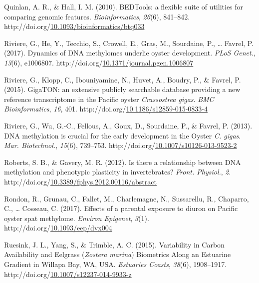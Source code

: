 \documentclass [11pt, proquest] {uwthesis}[2015/03/03]
\newlength{\cslhangindent}
\newenvironment{CSLReferences}%
{\setlength{\parindent}{0pt}%
\everypar{\setlength{\hangindent}{\cslhangindent}}\ignorespaces}%
{\par}
\begin{document}
\begin{CSLReferences}{1}{0}
\leavevmode\hypertarget{ref-Quinlan2010}{}%
Quinlan, A. R., \& Hall, I. M. (2010). {BEDTools: a flexible suite of utilities for comparing genomic features}. \emph{Bioinformatics}, \emph{26}(6), 841--842. http://doi.org/\href{https://doi.org/10.1093/bioinformatics/btq033}{10.1093/bioinformatics/btq033}

\leavevmode\hypertarget{ref-Riviere2017}{}%
Riviere, G., He, Y., Tecchio, S., Crowell, E., Gras, M., Sourdaine, P., \ldots{} Favrel, P. (2017). {Dynamics of DNA methylomes underlie oyster development}. \emph{PLoS Genet.}, \emph{13}(6), e1006807. http://doi.org/\href{https://doi.org/10.1371/journal.pgen.1006807}{10.1371/journal.pgen.1006807}

\leavevmode\hypertarget{ref-Riviere2015}{}%
Riviere, G., Klopp, C., Ibouniyamine, N., Huvet, A., Boudry, P., \& Favrel, P. (2015). {GigaTON: an extensive publicly searchable database providing a new reference transcriptome in the Pacific oyster \emph{Crassostrea gigas}}. \emph{BMC Bioinformatics}, \emph{16}, 401. http://doi.org/\href{https://doi.org/10.1186/s12859-015-0833-4}{10.1186/s12859-015-0833-4}

\leavevmode\hypertarget{ref-Riviere2013}{}%
Riviere, G., Wu, G.-C., Fellous, A., Goux, D., Sourdaine, P., \& Favrel, P. (2013). {DNA methylation is crucial for the early development in the Oyster \emph{C. gigas}}. \emph{Mar. Biotechnol.}, \emph{15}(6), 739--753. http://doi.org/\href{https://doi.org/10.1007/s10126-013-9523-2}{10.1007/s10126-013-9523-2}

\leavevmode\hypertarget{ref-Roberts2012}{}%
Roberts, S. B., \& Gavery, M. R. (2012). {Is there a relationship between DNA methylation and phenotypic plasticity in invertebrates?} \emph{Front. Physiol.}, \emph{2}. http://doi.org/\href{https://doi.org/10.3389/fphys.2012.00116/abstract}{10.3389/fphys.2012.00116/abstract}

\leavevmode\hypertarget{ref-Rondon2017}{}%
Rondon, R., Grunau, C., Fallet, M., Charlemagne, N., Sussarellu, R., Chaparro, C., \ldots{} Cosseau, C. (2017). {Effects of a parental exposure to diuron on Pacific oyster spat methylome}. \emph{Environ Epigenet}, \emph{3}(1). http://doi.org/\href{https://doi.org/10.1093/eep/dvx004}{10.1093/eep/dvx004}

\leavevmode\hypertarget{ref-Ruesink2015}{}%
Ruesink, J. L., Yang, S., \& Trimble, A. C. (2015). {Variability in Carbon Availability and Eelgrass (\emph{Zostera marina}) Biometrics Along an Estuarine Gradient in Willapa Bay, WA, USA}. \emph{Estuaries Coasts}, \emph{38}(6), 1908--1917. http://doi.org/\href{https://doi.org/10.1007/s12237-014-9933-z}{10.1007/s12237-014-9933-z}


\end{CSLReferences}
\end{document}
